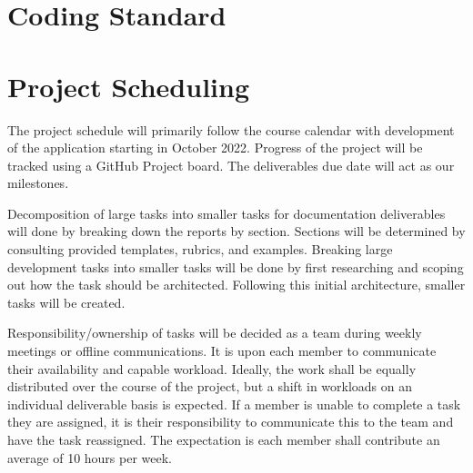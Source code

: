 \documentclass{article}
\begin{document}
\section{Coding Standard}

\section{Project Scheduling}


The project schedule will primarily follow the course calendar with development of the application
starting in October 2022. Progress of the project will be tracked using a GitHub Project board. The
deliverables due date will act as our milestones.

Decomposition of large tasks into smaller tasks for documentation deliverables will done by breaking
down the reports by section. Sections will be determined by consulting provided templates, rubrics,
and examples. Breaking large development tasks into smaller tasks will be done by first researching
and scoping out how the task should be architected. Following this initial architecture, smaller
tasks will be created.

Responsibility/ownership of tasks will be decided as a team during weekly meetings or offline
communications. It is upon each member to communicate their availability and capable workload.
Ideally, the work shall be equally distributed over the course of the project, but a shift in
workloads on an individual deliverable basis is expected. If a member is unable to complete a task
they are assigned, it is their responsibility to communicate this to the team and have the task
reassigned. The expectation is each member shall contribute an average of 10 hours per week.
\end{document}
